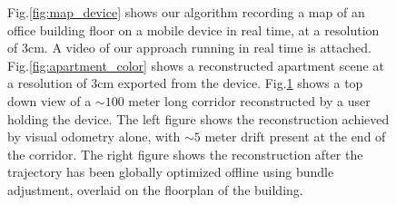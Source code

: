 \documentclass[conference]{IEEEtran}
\newcommand{\figref}[1]{Fig.\ref{#1}}
\begin{document}
\begin{figure}
\begin{subfigure}{0.35\linewidth}
	 \caption{}
	 \label{fig:drift}
	 \end{subfigure}
      \caption{\figref{fig:map_device} shows our algorithm recording a map
      of an office building floor on a mobile device in real time, at a resolution of 3cm. A video of our approach running
  in real time is attached. \figref{fig:apartment_color} shows a
  reconstructed apartment scene at a resolution of 3cm exported from the
  device. \figref{fig:drift} shows a top down view of a $\sim 100$ meter long
  corridor reconstructed by a user holding the device. The left figure shows the reconstruction achieved
  by visual odometry alone, with $\sim 5$ meter drift present at the end of the
  corridor. The right figure shows the reconstruction after the trajectory has
  been globally optimized offline using bundle adjustment, overlaid on the
  floorplan of the building.}
  \label{fig:first_figure}
\end{figure} 
\end{document}
